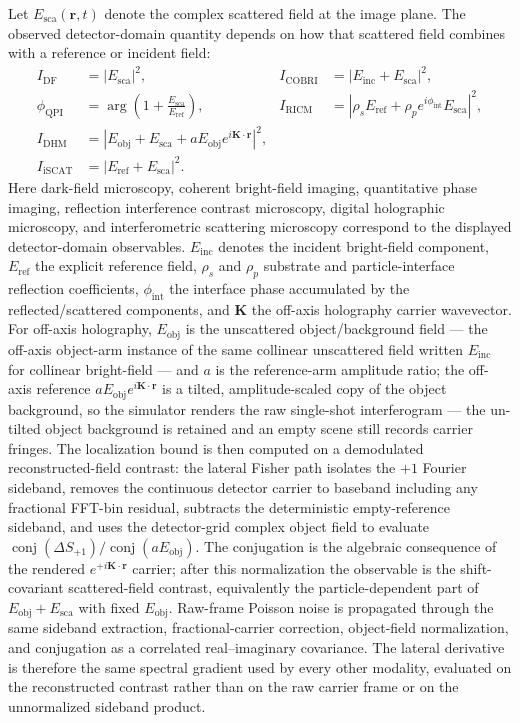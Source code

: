 Let $E_{\mathrm{sca}}(\mathbf{r},t)$ denote the complex scattered field at the image plane. The observed detector-domain quantity depends on how that scattered field combines with a reference or incident field:
\begin{align}
I_{\mathrm{DF}} &= |E_{\mathrm{sca}}|^2, &
I_{\mathrm{COBRI}} &= |E_{\mathrm{inc}}+E_{\mathrm{sca}}|^2, \\
\phi_{\mathrm{QPI}} &= \arg\!\left(1+\frac{E_{\mathrm{sca}}}{E_{\mathrm{ref}}}\right), &
I_{\mathrm{RICM}} &= |\rho_sE_{\mathrm{ref}}+\rho_p e^{i\phi_{\mathrm{int}}}E_{\mathrm{sca}}|^2, \\
I_{\mathrm{DHM}} &= |E_{\mathrm{obj}}+E_{\mathrm{sca}}+aE_{\mathrm{obj}}e^{i\mathbf{K}\cdot\mathbf{r}}|^2, \\
I_{\mathrm{iSCAT}} &= |E_{\mathrm{ref}}+E_{\mathrm{sca}}|^2 .
\end{align}
Here dark-field microscopy, coherent bright-field imaging, quantitative phase imaging, reflection interference contrast microscopy, digital holographic microscopy, and interferometric scattering microscopy correspond to the displayed detector-domain observables. $E_{\mathrm{inc}}$ denotes the incident bright-field component, $E_{\mathrm{ref}}$ the explicit reference field, $\rho_s$ and $\rho_p$ substrate and particle-interface reflection coefficients, $\phi_{\mathrm{int}}$ the interface phase accumulated by the reflected/scattered components, and $\mathbf{K}$ the off-axis holography carrier wavevector. For off-axis holography, $E_{\mathrm{obj}}$ is the unscattered object/background field --- the off-axis object-arm instance of the same collinear unscattered field written $E_{\mathrm{inc}}$ for collinear bright-field --- and $a$ is the reference-arm amplitude ratio; the off-axis reference $aE_{\mathrm{obj}}e^{i\mathbf{K}\cdot\mathbf{r}}$ is a tilted, amplitude-scaled copy of the object background, so the simulator renders the raw single-shot interferogram --- the un-tilted object background is retained and an empty scene still records carrier fringes. The localization bound is then computed on a demodulated reconstructed-field contrast: the lateral Fisher path isolates the $+1$ Fourier sideband, removes the continuous detector carrier to baseband including any fractional FFT-bin residual, subtracts the deterministic empty-reference sideband, and uses the detector-grid complex object field to evaluate $\operatorname{conj}(\Delta S_{+1})/\operatorname{conj}(aE_{\mathrm{obj}})$. The conjugation is the algebraic consequence of the rendered $e^{+i\mathbf{K}\cdot\mathbf{r}}$ carrier; after this normalization the observable is the shift-covariant scattered-field contrast, equivalently the particle-dependent part of $E_{\mathrm{obj}}+E_{\mathrm{sca}}$ with fixed $E_{\mathrm{obj}}$. Raw-frame Poisson noise is propagated through the same sideband extraction, fractional-carrier correction, object-field normalization, and conjugation as a correlated real--imaginary covariance. The lateral derivative is therefore the same spectral gradient used by every other modality, evaluated on the reconstructed contrast rather than on the raw carrier frame or on the unnormalized sideband product.

